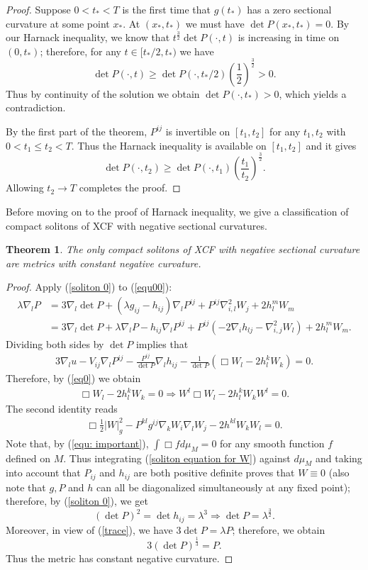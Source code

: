 \documentclass{amsart}
\newtheorem{theorem}{Theorem}
\theoremstyle{definition}
\theoremstyle{remark}
\numberwithin{equation}{section}
\begin{document}
\begin{proof}
Suppose $0<t_{\ast}<T$ is the first time that $g(t_{\ast})$ has a zero sectional curvature at some point $x_{\ast}$. At $(x_{\ast},t_{\ast})$ we must have $\det P(x_{\ast},t_{\ast})=0.$
By our Harnack inequality, we know that $t^{\frac{3}{2}}\det P(\cdot,t) $ is increasing in time on $(0,t_{\ast})$; therefore, for any $t\in [t_{\ast}/2, t_{\ast})$ we have
\[\det P(\cdot,t)\geq \det P(\cdot,t_{\ast}/2)\left(\frac{1}{2}\right)^{\frac{3}{2}}>0.\]
Thus by continuity of the solution we obtain $\det P(\cdot,t_{\ast})>0$, which yields a contradiction.

By the first part of the theorem, $P^{ij}$ is invertible on $[t_1,t_2]$ for any $t_1,t_2$ with $0<t_1\leq t_2<T.$ Thus the Harnack inequality is available on $[t_1,t_2]$ and it gives
\[\det P(\cdot,t_2)\geq \det P(\cdot,t_1)\left(\frac{t_1}{t_2}\right)^{\frac{3}{2}}.\]
Allowing $t_2\to T$ completes the proof.
\end{proof}
Before moving on to the proof of Harnack inequality, we give a classification of compact solitons of XCF with negative sectional curvatures.
\begin{theorem}
The only compact solitons of XCF with negative sectional curvature are metrics with constant negative curvature.
\end{theorem}
\begin{proof}
Apply (\ref{soliton 0}) to (\ref{equ00}):
\begin{align*}
\lambda \nabla_l P&=3\nabla_l\det P+(\lambda g_{ij}-h_{ij})\nabla_l P^{ij}+P^{ij}\nabla^2_{i,l}W_j+2h_l^mW_m\\
&=3\nabla_l\det P+\lambda \nabla_l P-h_{ij}\nabla_l P^{ij}+P^{ij}(-2\nabla_ih_{lj}-\nabla^2_{i,j}W_l)+2h_l^mW_m.
\end{align*}
Dividing both sides by $\det P$ implies that
\begin{align*}
3\nabla_lu-V_{ij}\nabla_l P^{ij}-\frac{P^{ij}}{\det P}\nabla_lh_{ij}-\frac{1}{\det P}(\Box W_l-2h_l^kW_k)=0.
\end{align*}
Therefore, by (\ref{eq0}) we obtain
\begin{align*}
\Box W_l-2h_l^kW_k=0\Rightarrow W^l\Box W_l-2h_l^kW_kW^l=0.
\end{align*}
The second identity reads
\begin{align}\label{soliton equation for W}
\Box \frac{1}{2}|W|_g^2-P^{kl}g^{ij}\nabla_kW_i\nabla_lW_j-2h^{kl}W_kW_l=0.
\end{align}
Note that, by (\ref{equ: important}), $\int \Box fd\mu_{M}=0$ for any smooth function $f$ defined on $M$. Thus integrating (\ref{soliton equation for W}) against $d\mu_{M}$ and taking into account that $P_{ij}$ and $h_{ij}$ are both positive definite proves that $W\equiv0$ (also note that $g,P$ and $h$ can all be diagonalized simultaneously at any fixed point); therefore, by (\ref{soliton 0}), we get
\[(\det P)^2=\det h_{ij}=\lambda ^3\Rightarrow \det P=\lambda^{\frac{3}{2}}.\]
Moreover, in view of (\ref{trace}), we have $3\det P=\lambda P$; therefore, we obtain $$3(\det P)^{\frac{1}{3}}=P.$$ Thus the metric has constant negative curvature.
\end{proof}
\end{document}
